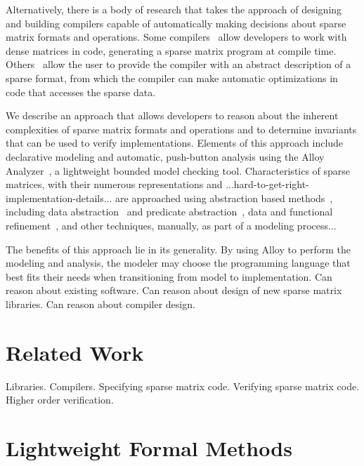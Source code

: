 \documentclass[11pt,conference]{IEEEtran}
\begin{document}
Alternatively, there is a body of research that takes the approach of designing and building compilers capable of automatically making decisions about sparse matrix formats and operations.  Some compilers~\cite{bik1995, bik1996} allow developers to work with dense matrices in code, generating a sparse matrix program at compile time.  Others~\cite{kotlyar1997} allow the user to provide the compiler with an abstract description of a sparse format, from which the compiler can make automatic optimizations in code that accesses the sparse data.

We describe an approach that allows developers to reason about the inherent complexities of sparse matrix formats and operations and to determine invariants that can be used to verify implementations.
Elements of this approach include declarative modeling and automatic, push-button analysis using the Alloy Analyzer~\cite{jackson2012}, a lightweight bounded model checking tool.  Characteristics of sparse matrices, with their numerous representations and ...hard-to-get-right-implementation-details... are approached using abstraction based methods~\cite{clarke1994}, including data abstraction~\cite{dingel1995} and predicate abstraction~\cite{graf1997}, data and functional refinement~\cite{woodcock1996}, and other techniques, manually, as part of a modeling process...

The benefits of this approach lie in its generality.  By using Alloy to perform the modeling and analysis, the modeler may choose the programming language that best fits their needs when transitioning from model to implementation.
Can reason about existing software.
Can reason about design of new sparse matrix libraries.
Can reason about compiler design.

\section{Related Work}

Libraries.
Compilers.
Specifying sparse matrix code.
Verifying sparse matrix code.
Higher order verification.

\section{Lightweight Formal Methods}
\end{document}
